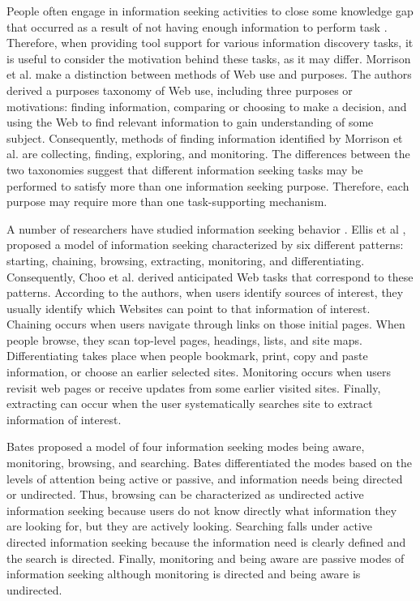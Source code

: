 \documentclass{casconpaper}
\begin{document}
{People often engage in information seeking activities to close some knowledge gap that occurred as a result of not having enough information to perform task \cite{proper}. Therefore, when providing tool support for various information discovery tasks, it is useful to consider the motivation behind these tasks, as it may differ. Morrison et al. \cite{morrison} make a distinction between methods of Web use and purposes. The authors derived a purposes taxonomy of Web use, including three purposes or motivations: finding information, comparing or choosing to make a decision, and using the Web to find relevant information to gain understanding of some subject. Consequently, methods of finding information identified by Morrison et al. are collecting, finding, exploring, and monitoring. The differences between the two taxonomies suggest that different information seeking tasks may be performed to satisfy more than one information seeking purpose. Therefore, each purpose may require more than one task-supporting mechanism. 

A number of researchers have studied information seeking behavior \cite{bates2002, bates1986, choo, ellis1989, ellis1997, ellis1993}. Ellis et al \cite{ellis1989, ellis1997, ellis1993}, proposed a model of information seeking characterized by six different patterns: starting, chaining, browsing, extracting, monitoring, and differentiating. Consequently, Choo et al. \cite{choo} derived anticipated Web tasks that correspond to these patterns. According to the authors, when users identify sources of interest, they usually identify which Websites can point to that information of interest.  Chaining occurs when users navigate through links on those initial pages. When people browse, they scan top-level pages, headings, lists, and site maps. Differentiating takes place when people bookmark, print, copy and paste information, or choose an earlier selected sites. Monitoring occurs when users revisit web pages or receive updates from some earlier visited sites. Finally, extracting can occur when the user systematically searches site to extract information of interest. 

Bates \cite{bates1986} proposed a model of four information seeking modes being aware, monitoring, browsing, and searching. Bates differentiated the modes based on the levels of attention being active or passive, and information needs being directed or undirected. Thus, browsing can be characterized as undirected active information seeking because users do not know directly what information they are looking for, but they are actively looking. Searching falls under active directed information seeking because the information need is clearly defined and the search is directed. Finally, monitoring and being aware are passive modes of information seeking although monitoring is directed and being aware is undirected.   

}
\end{document}
